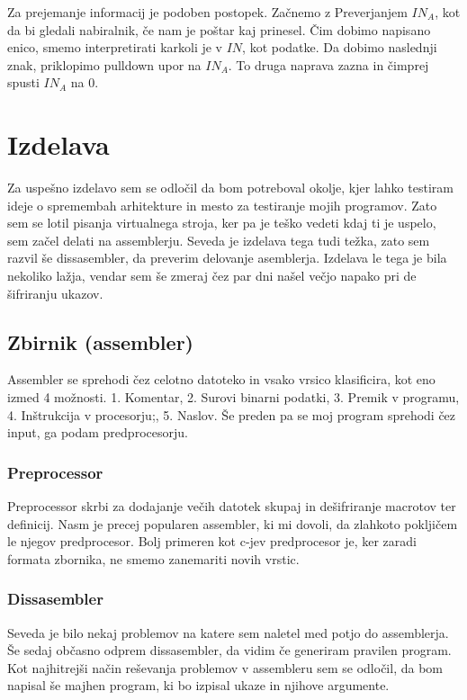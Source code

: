\documentclass[12pt]{article}
\begin{document}
Za prejemanje informacij je podoben postopek.
Začnemo z Preverjanjem $IN_{A}$, kot da bi gledali nabiralnik, če nam je poštar kaj prinesel.
Čim dobimo napisano enico, smemo interpretirati karkoli je v $IN$, kot podatke.
Da dobimo naslednji znak, priklopimo pulldown upor na $IN_{A}$.
To druga naprava zazna in čimprej spusti $IN_{A}$ na 0.


\section{Izdelava} %
Za uspešno izdelavo sem se odločil da bom potreboval okolje, kjer lahko testiram ideje o spremembah arhitekture in mesto za testiranje mojih programov.
Zato sem se lotil pisanja virtualnega stroja, ker pa je teško vedeti kdaj ti je uspelo, sem začel delati na assemblerju.
Seveda je izdelava tega tudi težka, zato sem razvil še dissasembler, da preverim delovanje asemblerja.
Izdelava le tega je bila nekoliko lažja,  vendar sem še zmeraj čez par dni našel večjo napako pri de šifriranju ukazov.

\subsection{Zbirnik (assembler)}
Assembler se sprehodi čez celotno datoteko in vsako vrsico klasificira, kot eno izmed 4 možnosti.
1. Komentar,
2. Surovi binarni podatki,
3. Premik v programu,
4. Inštrukcija v procesorju;,
5. Naslov.
Še preden pa se moj program sprehodi čez input, ga podam predprocesorju.
\subsubsection{Preprocessor}
Preprocessor skrbi za dodajanje večih datotek skupaj in dešifriranje macrotov ter definicij.
Nasm je precej popularen assembler, ki mi dovoli, da zlahkoto pokljičem le njegov predprocesor.
Bolj primeren kot c-jev predprocesor je, ker zaradi formata zbornika, ne smemo zanemariti novih vrstic.
\subsubsection{Dissasembler}
Seveda je bilo nekaj problemov na katere sem naletel med potjo do assemblerja.
Še sedaj občasno odprem dissasembler, da vidim če generiram pravilen program.
Kot najhitrejši način reševanja problemov v assembleru sem se odločil, da bom napisal še majhen program, ki bo izpisal ukaze in njihove argumente.
\end{document}
